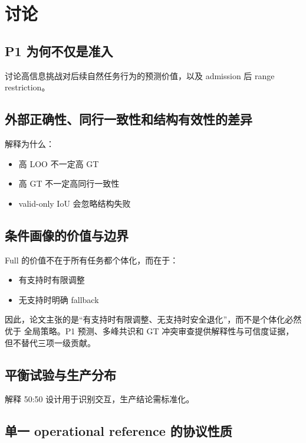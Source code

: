 \section{讨论}

\subsection{P1 为何不仅是准入}

讨论高信息挑战对后续自然任务行为的预测价值，以及 admission 后 range restriction。

\subsection{外部正确性、同行一致性和结构有效性的差异}

解释为什么：
\begin{itemize}
  \item 高 LOO 不一定高 GT
  \item 高 GT 不一定高同行一致性
  \item valid-only IoU 会忽略结构失败
\end{itemize}

\subsection{条件画像的价值与边界}

Full 的价值不在于所有任务都个体化，而在于：
\begin{itemize}
  \item 有支持时有限调整
  \item 无支持时明确 fallback
\end{itemize}

因此，论文主张的是“有支持时有限调整、无支持时安全退化”，而不是个体化必然优于
全局策略。P1 预测、多峰共识和 GT 冲突审查提供解释性与可信度证据，但不替代三项一级贡献。

\subsection{平衡试验与生产分布}

解释 50:50 设计用于识别交互，生产结论需标准化。

\subsection{单一 operational reference 的协议性质}

